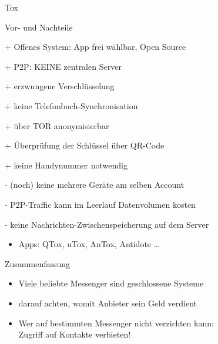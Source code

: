 \begin{frame}{Tox}
\begin{blex}{Vor- und Nachteile}
\item[+] Offenes System: App frei wählbar, Open Source
\item[+] P2P: KEINE zentralen Server
\item[+] erzwungene Verschlüsselung
\item[+] keine Telefonbuch-Synchronisation
\item[+] über TOR anonymisierbar
\item[+] Überprüfung der Schlüssel über QR-Code
\item[+] keine Handynummer notwendig
\item[-] (noch) keine mehrere Geräte am selben Account
\item[-] P2P-Traffic kann im Leerlauf Datenvolumen kosten
\item[-] keine Nachrichten-Zwischenspeicherung auf dem Server
\begin{itemize}
  \item    Apps: QTox, uTox, AnTox, Antidote  \ldots
\end{itemize}
\end{blex}
\end{frame}

\begin{frame}{Zusammenfassung}
  \begin{itemize}
    \item Viele beliebte Messenger sind geschlossene Systeme
    \item darauf achten, womit Anbieter sein Geld verdient
    \item Wer auf bestimmten Messenger nicht verzichten kann:\\Zugriff auf Kontakte verbieten!
  \end{itemize}
\end{frame}

